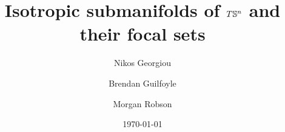 \documentclass[12pt]{amsart}
\theoremstyle{plain}
\theoremstyle{definition}
\def\S{\mathbb{S}}
\numberwithin{equation}{section}
\begin{document}
\title{Isotropic submanifolds of \texorpdfstring{$T\S^\MakeLowercase{n}$}{TS^n} and their focal sets}
\author{Nikos Georgiou}
\address{Nikos Georgiou\\
  Department of Mathematics\\
          South East Technological University\\
          Waterford\\
          Co. Waterford\\
          Ireland.}


\author{Brendan Guilfoyle}
\address{Brendan Guilfoyle\\
          Faculty of Science and Informatics\\
          Munster Technological University, Kerry\\
          Tralee\\
          Co. Kerry\\
          Ireland.}


\author{Morgan Robson}
\address{Morgan Robson\\
  Department of Mathematics\\
          South East Technological University\\
          Waterford\\
          Co. Waterford\\
          Ireland.}

\date{\today}
\end{document}
